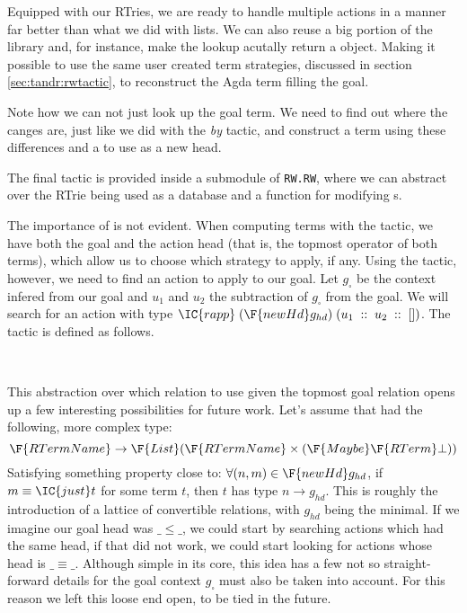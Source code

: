 Equipped with our RTries, we are ready to handle multiple actions in a manner far better
than what we did with lists. We can also reuse a big portion of the library and,
for instance, make the lookup acutally return a  object. Making
it possible to use the same user created term strategies, discussed in section \ref{sec:tandr:rwtactic},
to reconstruct the Agda term filling the goal.


Note how we can not just look up the goal term. We need to find out where the canges are,
just like we did with the \emph{by} tactic, and construct a term using these differences
and a  to use as a new head.

The final tactic is provided inside a submodule of \texttt{\small RW.RW}, where
we can abstract over the RTrie being used as a database and a function for modifying
s.


The importance of  is not evident. When computing terms with the  tactic,
we have both the goal and the action head (that is, the topmost operator of both terms),
which allow us to choose which strategy to apply, if any. Using the  tactic, however,
we need to find an action to apply to our goal. Let $g_\square$ be the context infered from
our goal and $u_1$ and $u_2$ the subtraction of $g_\square$ from the goal. We will search
for an action with type $\IC{rapp}\; (\F{newHd }g_{hd})\;(u_1\;::\;u_2\;::\;[])$. The tactic is defined as follows.

\\

This abstraction over which relation to use given the topmost goal relation opens up a few interesting
possibilities for future work. Let's assume that  had the following, more complex type: 
\[
\F{RTermName} \rightarrow \F{List }(\F{RTermName} \times (\F{Maybe }\F{RTerm }\bot))
\]
Satisfying something property close to: $\forall (n , m) \in \F{newHd }g_{hd}$, if $m \equiv \IC{just }t$
for some term $t$, then $t$ has type $n \rightarrow g_{hd}$. This is roughly the introduction
of a lattice of convertible relations, with $g_{hd}$ being the minimal. If we imagine
our goal head was $\_\leq\_$, we could start by searching actions which had the same head,
if that did not work, we could start looking for actions whose head is $\_\equiv\_$. Although
simple in its core, this idea has a few not so straight-forward details for the goal context $g_\square$
must also be taken into account. For this reason we left this loose end open, to be tied in the future.

